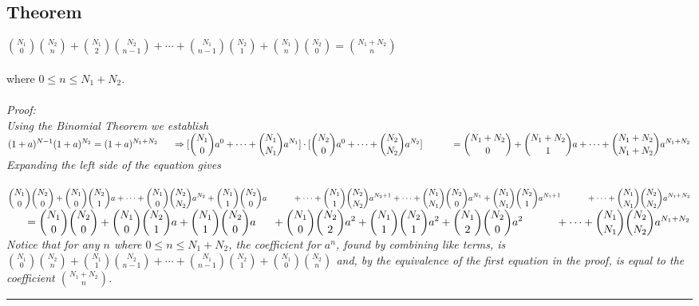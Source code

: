 \subsection{Theorem}
\label{BinomialTheor3.1}
$\displaystyle {N_1\choose 0}{N_2\choose n} + {N_1\choose 2}{N_2\choose n-1} + \cdots
		+ {N_1\choose n-1}{N_2\choose 1} + {N_1\choose n}{N_2\choose 0}
	= {N_1+N_2\choose n}$\\
\\
where $0 \leq n \leq N_1 + N_2$.\\
\\
\it Proof:\rm\\
Using the Binomial Theorem we establish\\
$\displaystyle (1+a)^{N-1} (1+a)^{N_2} = (1+a)^{N_1+N_2}\\\\
\indent\Rightarrow [{N_1\choose 0}a^0+\cdots+{N_1\choose N_1}a^{N_1}]\cdot
		[{N_2\choose 0}a^0+\cdots+{N_2\choose N_2}a^{N_2}]\\\\
\indent\indent={N_1+N_2\choose 0}+{N_1+N_2\choose 1}a+\cdots
		+{N_1+N_2\choose N_1+N_2}a^{N_1+N_2}\\\\$
Expanding the left side of the equation gives\\
\\
$\displaystyle {N_1\choose 0}{N_2\choose 0} + {N_1\choose 0}{N_2\choose 1}a + \cdots
		+ {N_1\choose 0}{N_2\choose N_2}a^{N_2} + {N_1\choose 1}{N_2\choose 0}a\\\\
\indent\indent + \cdots + {N_1\choose 1}{N_2\choose N_2}a^{N_2+1}
		+ \cdots + {N_1\choose N_1}{N_2\choose 0}a^{N_1}
		+ {N_1\choose N_1}{N_2\choose 1}a^{N_1+1}\\\\
\indent\indent + \cdots + {N_1\choose N_1}{N_2\choose N_2}a^{N_1+N_2}\\\\
$\newpage\noindent$
\displaystyle\indent = {N_1\choose 0}{N_2\choose 0}+{N_1\choose 0}{N_2\choose 1}a
		+ {N_1\choose 1}{N_2\choose 0}a\\\\
\indent		+ {N_1\choose 0}{N_2\choose 2}a^2+{N_1\choose 1}{N_2\choose 1}a^2
		+ {N_1\choose 2}{N_2\choose 0}a^2\\\\
\indent\indent	+ \cdots + {N_1\choose N_1}{N_2\choose N_2}a^{N_1+N_2}\\$
\\
Notice that for any $n$ where $0 \leq n \leq N_1 + N_2$, the coefficient for $a^n$, found by combining like terms, is ${N_1\choose 0}{N_2\choose n} + {N_1\choose 1}{N_2\choose n-1} + \cdots+{N_1\choose n-1}{N_2\choose 1} + {N_1\choose 0}{N_2\choose n}$ and, by the equivalence of the first equation in the proof, is equal to the coefficient ${N_1 + N_2\choose n}$. \rule{.05in}{.05in} \\


